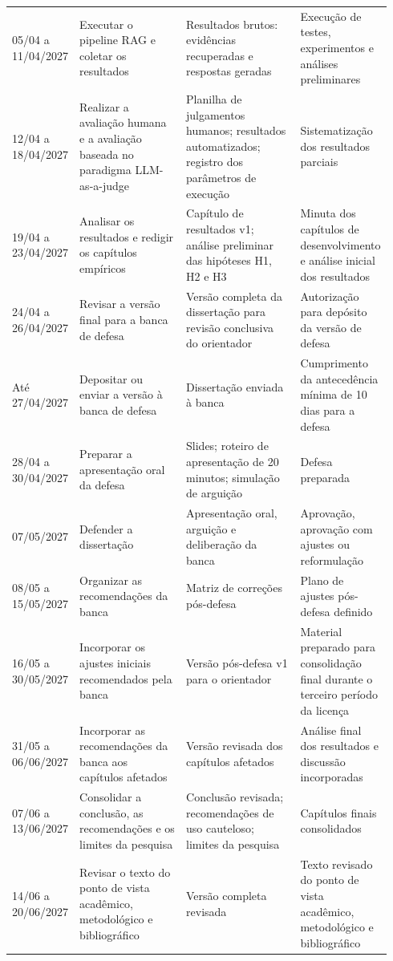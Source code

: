 \begin{landscape}
\begin{longtable}{p{0.12\linewidth}p{0.28\linewidth}p{0.30\linewidth}p{0.24\linewidth}}
05/04 a 11/04/2027 & Executar o pipeline RAG e coletar os resultados & Resultados brutos: evidências recuperadas e respostas geradas & Execução de testes, experimentos e análises preliminares \\
12/04 a 18/04/2027 & Realizar a avaliação humana e a avaliação baseada no paradigma LLM-as-a-judge & Planilha de julgamentos humanos; resultados automatizados; registro dos parâmetros de execução & Sistematização dos resultados parciais \\
19/04 a 23/04/2027 & Analisar os resultados e redigir os capítulos empíricos & Capítulo de resultados v1; análise preliminar das hipóteses H1, H2 e H3 & Minuta dos capítulos de desenvolvimento e análise inicial dos resultados \\
24/04 a 26/04/2027 & Revisar a versão final para a banca de defesa & Versão completa da dissertação para revisão conclusiva do orientador & Autorização para depósito da versão de defesa \\
Até 27/04/2027 & Depositar ou enviar a versão à banca de defesa & Dissertação enviada à banca & Cumprimento da antecedência mínima de 10 dias para a defesa \\
28/04 a 30/04/2027 & Preparar a apresentação oral da defesa & Slides; roteiro de apresentação de 20 minutos; simulação de arguição & Defesa preparada \\
07/05/2027 & Defender a dissertação & Apresentação oral, arguição e deliberação da banca & Aprovação, aprovação com ajustes ou reformulação \\
08/05 a 15/05/2027 & Organizar as recomendações da banca & Matriz de correções pós-defesa & Plano de ajustes pós-defesa definido \\
16/05 a 30/05/2027 & Incorporar os ajustes iniciais recomendados pela banca & Versão pós-defesa v1 para o orientador & Material preparado para consolidação final durante o terceiro período da licença \\
31/05 a 06/06/2027 & Incorporar as recomendações da banca aos capítulos afetados & Versão revisada dos capítulos afetados & Análise final dos resultados e discussão incorporadas \\
07/06 a 13/06/2027 & Consolidar a conclusão, as recomendações e os limites da pesquisa & Conclusão revisada; recomendações de uso cauteloso; limites da pesquisa & Capítulos finais consolidados \\
14/06 a 20/06/2027 & Revisar o texto do ponto de vista acadêmico, metodológico e bibliográfico & Versão completa revisada & Texto revisado do ponto de vista acadêmico, metodológico e bibliográfico \\

\end{longtable}
\end{landscape}
